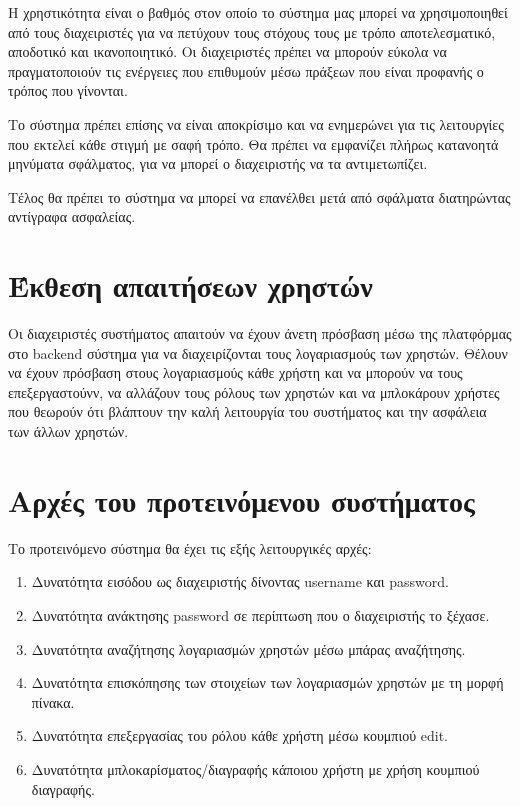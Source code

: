 \documentclass[12pt, oneside, a4paper]{report}
\begin{document}
\hspace{0.6cm}Η χρηστικότητα είναι ο βαθμός στον οποίο το σύστημα μας μπορεί να χρησιμοποιηθεί από τους διαχειριστές για να πετύχουν τους στόχους τους με τρόπο αποτελεσματικό, αποδοτικό και ικανοποιητικό. Οι διαχειριστές πρέπει να μπορούν εύκολα να πραγματοποιούν τις ενέργειες που επιθυμούν μέσω πράξεων που είναι προφανής ο τρόπος που γίνονται.

\hspace{0.6cm}Το σύστημα πρέπει επίσης να είναι αποκρίσιμο και να ενημερώνει για τις λειτουργίες που εκτελεί κάθε στιγμή με σαφή τρόπο. Θα πρέπει να εμφανίζει πλήρως κατανοητά μηνύματα σφάλματος, για να μπορεί ο διαχειριστής να τα αντιμετωπίζει. 

\hspace{0.6cm}Τέλος θα πρέπει το σύστημα να μπορεί να επανέλθει μετά από σφάλματα διατηρώντας αντίγραφα ασφαλείας. 

\section{Έκθεση απαιτήσεων χρηστών}

\hspace{0.6cm}Οι διαχειριστές συστήματος απαιτούν να έχουν άνετη πρόσβαση μέσω της πλατφόρμας στο backend σύστημα για να διαχειρίζονται τους λογαριασμούς των χρηστών. Θέλουν να έχουν πρόσβαση στους λογαριασμούς κάθε χρήστη και να μπορούν να τους επεξεργαστούνν, να αλλάζουν τους ρόλους των χρηστών και να μπλοκάρουν χρήστες που θεωρούν ότι βλάπτουν την καλή λειτουργία του συστήματος και την ασφάλεια των άλλων χρηστών. 

\section{Αρχές του προτεινόμενου συστήματος}

Το προτεινόμενο σύστημα θα έχει τις εξής λειτουργικές αρχές:
\newline
\begin{enumerate}
 \item Δυνατότητα εισόδου ως διαχειριστής δίνοντας username και password.
 \item Δυνατότητα ανάκτησης password σε περίπτωση που ο διαχειριστής το ξέχασε.
 \item Δυνατότητα αναζήτησης λογαριασμών χρηστών μέσω μπάρας αναζήτησης.
 \item Δυνατότητα επισκόπησης των στοιχείων των λογαριασμών χρηστών με τη μορφή πίνακα.
 \item Δυνατότητα επεξεργασίας του ρόλου κάθε χρήστη μέσω κουμπιού edit.
 \item Δυνατότητα μπλοκαρίσματος/διαγραφής κάποιου χρήστη με χρήση κουμπιού διαγραφής.
\end{enumerate}
\end{document}
